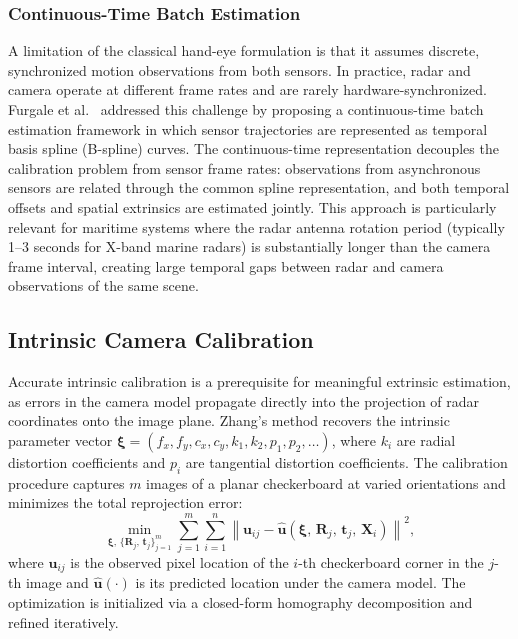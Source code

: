 \subsubsection{Continuous-Time Batch Estimation}

A limitation of the classical hand-eye formulation is that it assumes discrete, synchronized motion observations from both sensors. In practice, radar and camera operate at different frame rates and are rarely hardware-synchronized. Furgale et al.\ \cite{furgale2013unified} addressed this challenge by proposing a continuous-time batch estimation framework in which sensor trajectories are represented as temporal basis spline (B-spline) curves. The continuous-time representation decouples the calibration problem from sensor frame rates: observations from asynchronous sensors are related through the common spline representation, and both temporal offsets and spatial extrinsics are estimated jointly. This approach is particularly relevant for maritime systems where the radar antenna rotation period (typically 1--3 seconds for X-band marine radars) is substantially longer than the camera frame interval, creating large temporal gaps between radar and camera observations of the same scene.

\subsection{Intrinsic Camera Calibration}\label{sec:intrinsic_calib}

Accurate intrinsic calibration is a prerequisite for meaningful extrinsic estimation, as errors in the camera model propagate directly into the projection of radar coordinates onto the image plane. Zhang's method \cite{zhang2000flexible} recovers the intrinsic parameter vector $\boldsymbol{\xi} = (f_x, f_y, c_x, c_y, k_1, k_2, p_1, p_2, \ldots)$, where $k_i$ are radial distortion coefficients and $p_i$ are tangential distortion coefficients. The calibration procedure captures $m$ images of a planar checkerboard at varied orientations and minimizes the total reprojection error:
\begin{equation}\label{eq:reprojection}
  \min_{\boldsymbol{\xi},\,\{\mathbf{R}_j,\,\mathbf{t}_j\}_{j=1}^{m}}
  \sum_{j=1}^{m}\sum_{i=1}^{n}
  \left\| \mathbf{u}_{ij} - \hat{\mathbf{u}}(\boldsymbol{\xi},\,\mathbf{R}_j,\,\mathbf{t}_j,\,\mathbf{X}_i) \right\|^{2},
\end{equation}
where $\mathbf{u}_{ij}$ is the observed pixel location of the $i$-th checkerboard corner in the $j$-th image and $\hat{\mathbf{u}}(\cdot)$ is its predicted location under the camera model. The optimization is initialized via a closed-form homography decomposition and refined iteratively.

